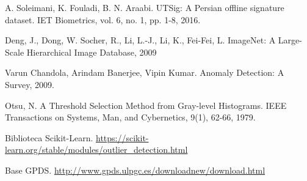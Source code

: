 \documentclass[11pt, twocolumn, a4paper]{article}
\begin{document}
\begin{thebibliography}{9}
A. Soleimani, K. Fouladi, B. N. Araabi. UTSig: A Persian offline signature dataset. IET Biometrics, vol. 6, no. 1, pp. 1-8, 2016.

Deng, J., Dong, W. Socher, R., Li, L.-J., Li, K., Fei-Fei, L. ImageNet: A Large-Scale Hierarchical Image Database, 2009

Varun Chandola, Arindam Banerjee, Vipin Kumar. Anomaly Detection: A Survey, 2009.

Otsu, N. A Threshold Selection Method from Gray-level Histograms. IEEE Transactions on Systems, Man, and Cybernetics, 9(1), 62-66, 1979.

Biblioteca Scikit-Learn. \url{https://scikit-learn.org/stable/modules/outlier_detection.html}

Base GPDS. \url{http://www.gpds.ulpgc.es/downloadnew/download.html}

\end{thebibliography}
\end{document}
